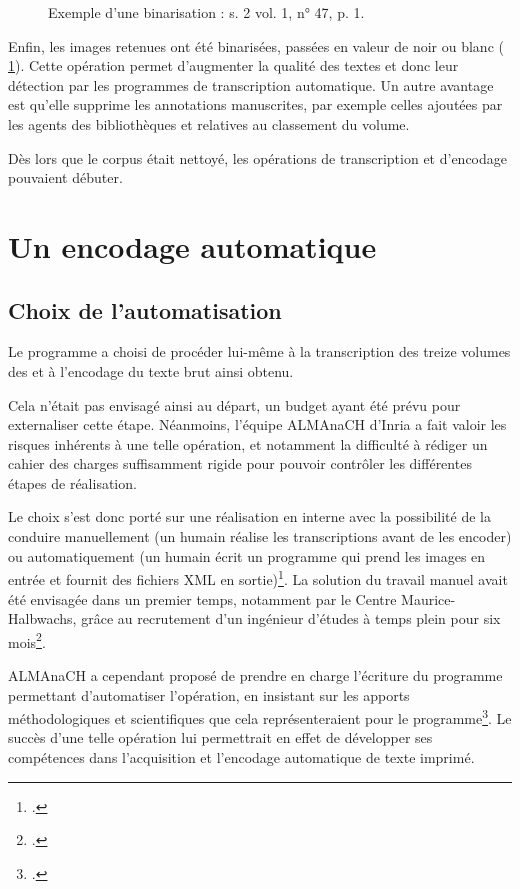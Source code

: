 \begin{figure}[h]
\begin{subfigure}[t]{0.4\textwidth}
    \end{subfigure}
    \caption[Exemple d'une binarisation]{Exemple d'une binarisation : s. 2 vol. 1, n° 47, p. 1.}
    \label{fig:binarisation}
\end{figure}

Enfin, les images retenues ont été binarisées, \cad{} passées en valeur de noir ou blanc (\fig{} \ref{fig:binarisation}). Cette opération permet d'augmenter la qualité des textes et donc leur détection par les programmes de transcription automatique. Un autre avantage est qu'elle supprime les annotations manuscrites, par exemple celles ajoutées par les agents des bibliothèques et relatives au classement du volume.

Dès lors que le corpus était nettoyé, les opérations de transcription et d'encodage pouvaient débuter.

\chapter{Un encodage automatique}

\section{Choix de l'automatisation}
Le programme \timeus{} a choisi de procéder lui-même à la transcription des treize volumes des \odm{} et à l'encodage du texte brut ainsi obtenu. 

Cela n'était pas envisagé ainsi au départ, un budget ayant été prévu pour externaliser cette étape. Néanmoins, l'équipe ALMAnaCH d'Inria a fait valoir les risques inhérents à une telle opération, et notamment la difficulté à rédiger un cahier des charges suffisamment rigide pour pouvoir contrôler les différentes étapes de réalisation.

Le choix s'est donc porté sur une réalisation en interne avec la possibilité de la conduire manuellement (un humain réalise les transcriptions avant de les encoder) ou automatiquement (un humain écrit un programme qui prend les images en entrée et fournit des fichiers XML en sortie)\footcite[p. 52]{chague}. La solution du travail manuel avait été envisagée dans un premier temps, notamment par le Centre Maurice-Halbwachs, grâce au recrutement d'un ingénieur d'études à temps plein pour six mois\footcite[p. 52]{chague}. 

ALMAnaCH a cependant proposé de prendre en charge l'écriture du programme permettant d'automatiser l'opération, en insistant sur les apports méthodologiques et scientifiques que cela représenteraient pour le programme\footcite[p. 52]{chague}. Le succès d'une telle opération lui permettrait en effet de développer ses compétences dans l'acquisition et l'encodage automatique de texte imprimé.

